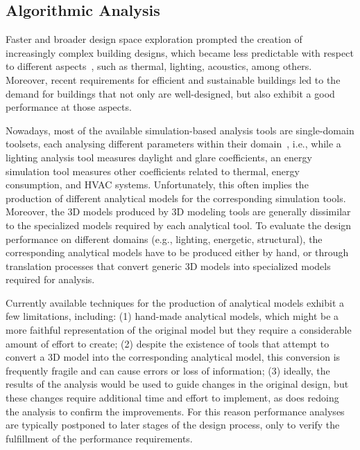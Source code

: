 \subsection{Algorithmic Analysis}

Faster and broader design space exploration prompted the creation of increasingly complex building designs, which became less predictable with respect to different aspects~\cite{Branco2017AD}, such as thermal, lighting, acoustics, among others. Moreover, recent requirements for efficient and sustainable buildings led to the demand for buildings that not only are well-designed, but also exhibit a good performance at those aspects.
	
	Nowadays, most of the available simulation-based analysis tools are single-domain toolsets, each analysing different parameters within their domain~\cite{Malkawi2005}, i.e., while a lighting analysis tool measures daylight and glare coefficients, an energy simulation tool measures other coefficients related to thermal, energy consumption, and \ac{HVAC} systems. Unfortunately, this often implies the production of different analytical models for the corresponding simulation tools. Moreover, the 3D models produced by 3D modeling tools are generally dissimilar to the specialized models required by each analytical tool. To evaluate the design performance on different domains (e.g., lighting, energetic, structural), the corresponding analytical models have to be produced either by hand, or through translation processes that convert generic 3D models into specialized models required for analysis.

	Currently available techniques for the production of analytical models exhibit a few limitations, including: (1) hand-made analytical models, which might be a more faithful representation of the original model but they require a considerable amount of effort to create; (2) despite the existence of tools that attempt to convert a 3D model into the corresponding analytical model, this conversion is frequently fragile and can cause errors or loss of information; (3) ideally, the results of the analysis would be used to guide changes in the original design, but these changes require additional time and effort to implement, as does redoing the analysis to confirm the improvements. For this reason performance analyses are typically postponed to later stages of the design process, only to verify the fulfillment of the performance requirements.

